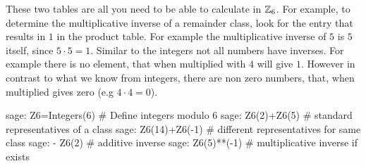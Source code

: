 \begin{example} 
These two tables are all you need to be able to calculate in $ \mathbb{Z}_6 $. For example, to determine the multiplicative inverse of a remainder class, look for the entry that results in $ 1 $ in the product table. For example the multiplicative inverse of $ 5 $ is $ 5 $ itself, since $5\cdot 5 = 1$. Similar to the integers not all numbers have inverses. For example there is no element, that when multiplied with $4$ will give $1$. 
However in contrast to what we know from integers, there are non zero numbers, that, when multiplied gives zero (e.g $4\cdot 4 =0$).

\begin{sagecommandline}
sage: Z6=Integers(6) # Define integers modulo 6 
sage: Z6(2)+Z6(5) # standard representatives of a class
sage: Z6(14)+Z6(-1) # different representatives for same class
sage: - Z6(2) # additive inverse
sage: Z6(5)**(-1) # multiplicative inverse if exists
\end{sagecommandline}
\end{example}

